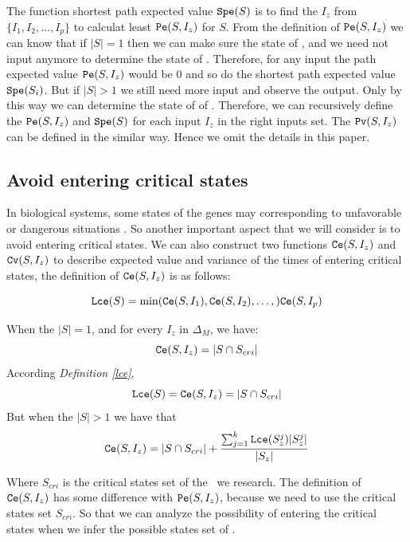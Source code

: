 The function shortest path  expected value ${\tt Spe}(S)$ is to find the $I_z$ from $\{I_1,I_2,\ldots, I_p\}$ to calculat least ${\tt Pe}(S, I_z)$ for $S$. From the definition of ${\tt Pe}(S, I_z)$ we can know that if $|S|=1$ then we can make sure the state of \BCNs, and we need not input anymore to determine the state of \BCNs. Therefore, for any input the path expected value ${\tt Pe}(S, I_z)$ would be $0$ and so do the shortest path  expected value ${\tt Spe}(S_i)$. But if $|S|>1$ we still need more input and observe the output. Only by this way we can determine the state of of \BCNs. Therefore,  we can recursively define the ${\tt Pe}(S, I_z)$ and ${\tt Spe}(S)$ for each input $I_z$ in the right inputs set.  The ${\tt Pv}(S, I_z)$ can be defined in the similar way. Hence we omit the details in this paper. 

\subsection{Avoid entering critical states}
In biological systems, some states of the genes may corresponding to unfavorable or dangerous situations \cite{Li2014Controllability}. So another important aspect that we will consider is to avoid entering critical states. We can also construct two functions $\Ce(S, I_z)$ and ${\tt Cv}(S, I_z)$ to describe expected value and variance of the times of entering critical states, the definition of $\Ce(S, I_z)$ is as follows:\\
\begin{definition}[$\Lce(S)$] \label{lce}
\[{\tt Lce}(S)= \min({\tt Ce}(S, I_1),{\tt Ce}(S, I_2),\ldots,){\tt Ce}(S, I_p)\]
\end{definition}
\begin{definition}[$\Ce(S, I_z)$] 
When the $|S|=1$, and for every $I_z$ in $\Delta_M$, we have: \[{\tt Ce}(S, I_z)=|S \cap S_{cri} |\] 
According {\em Definition \ref{lce}}, %
\[{\tt Lce}(S)={\tt Ce}(S, I_z)=|S \cap S_{cri} |\] 
But when the $|S|>1$ 
we have that 
\[{\tt Ce}(S, I_z)=|S \cap S_{cri} | +\frac{\sum_{j=1}^k {\tt Lce}(S_z^j)|S_z^j|}{ |S_z|} \] 
\end{definition}

Where $S_{cri}$ is the critical states set of the \BCN\ we research. The definition of $\Ce(S, I_z)$ has some difference with ${\tt Pe}(S, I_z)$, because we need to use the critical states set $S_{cri}$. So that  we can analyze the possibility of entering the  critical states when we infer the possible states set of \BCNs.

